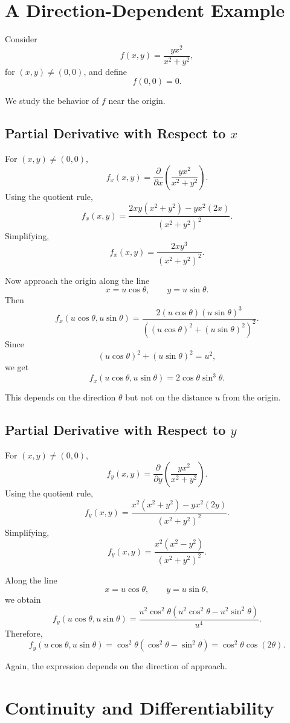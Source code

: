 \documentclass[12pt,oneside]{book}
\numberwithin{equation}{section}
\theoremstyle{definition}
\theoremstyle{plain}
\theoremstyle{remark}
\begin{document}
\section{A Direction-Dependent Example}

Consider
\[
f(x,y)=\frac{yx^2}{x^2+y^2},
\]
for $(x,y)\neq (0,0)$, and define
\[
f(0,0)=0.
\]

We study the behavior of $f$ near the origin.

\subsection{Partial Derivative with Respect to $x$}

For $(x,y)\neq (0,0)$,
\[
f_x(x,y)
=
\frac{\partial}{\partial x}
\left(
\frac{yx^2}{x^2+y^2}
\right).
\]
Using the quotient rule,
\[
f_x(x,y)
=
\frac{2xy(x^2+y^2)-yx^2(2x)}{(x^2+y^2)^2}.
\]
Simplifying,
\[
f_x(x,y)
=
\frac{2xy^3}{(x^2+y^2)^2}.
\]

Now approach the origin along the line
\[
x=u\cos\theta,
\qquad
y=u\sin\theta.
\]
Then
\[
f_x(u\cos\theta,u\sin\theta)
=
\frac{2(u\cos\theta)(u\sin\theta)^3}
{\left((u\cos\theta)^2+(u\sin\theta)^2\right)^2}.
\]
Since
\[
(u\cos\theta)^2+(u\sin\theta)^2=u^2,
\]
we get
\[
f_x(u\cos\theta,u\sin\theta)
=
2\cos\theta\sin^3\theta.
\]

This depends on the direction $\theta$ but not on the distance $u$ from the origin.

\subsection{Partial Derivative with Respect to $y$}

For $(x,y)\neq (0,0)$,
\[
f_y(x,y)
=
\frac{\partial}{\partial y}
\left(
\frac{yx^2}{x^2+y^2}
\right).
\]
Using the quotient rule,
\[
f_y(x,y)
=
\frac{x^2(x^2+y^2)-yx^2(2y)}{(x^2+y^2)^2}.
\]
Simplifying,
\[
f_y(x,y)
=
\frac{x^2(x^2-y^2)}{(x^2+y^2)^2}.
\]

Along the line
\[
x=u\cos\theta,
\qquad
y=u\sin\theta,
\]
we obtain
\[
f_y(u\cos\theta,u\sin\theta)
=
\frac{u^2\cos^2\theta\left(u^2\cos^2\theta-u^2\sin^2\theta\right)}
{u^4}.
\]
Therefore,
\[
f_y(u\cos\theta,u\sin\theta)
=
\cos^2\theta(\cos^2\theta-\sin^2\theta)
=
\cos^2\theta\cos(2\theta).
\]

Again, the expression depends on the direction of approach.

\section{Continuity and Differentiability}
\end{document}
